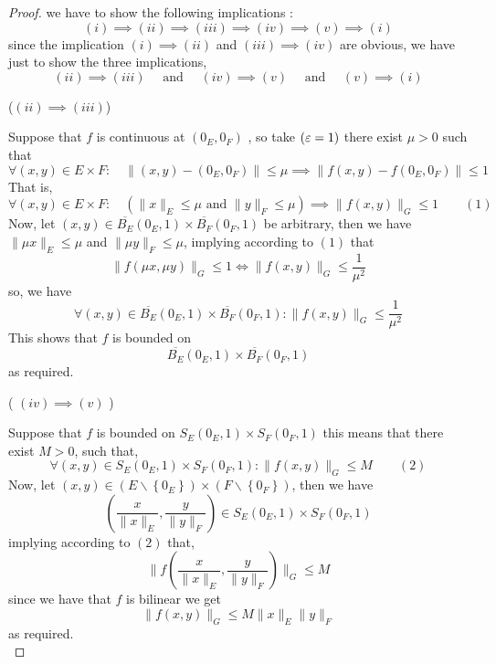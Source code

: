 \begin{proof}
we have to show the following implications : 
\[
(i)  \implies (ii) \implies (iii) \implies (iv) \implies (v) \implies  (i)      
\]
since the implication $(i ) \implies (ii)  $  and $(iii)  \implies (iv)  $ are obvious, 
we have just to show the three implications, 
\[
(ii) \implies (iii) \quad   \text{ and }   \quad 
(iv) \implies (v)  \quad   \text{ and } \quad    (v)  \implies (i)
\]

\begin{center}
	($(ii)  \implies (iii)  $) 
\end{center}

Suppose that $f $ is continuous at $(0_{E},0_{F})  $ , so take 
$( \varepsilon = 1)  $  there exist $\mu  > 0 $ such that 
\[
	\forall  (x,y)  \in E \times F  : \quad 
	\| (x,y) - (0_{E}, 0_{F})  \|  \leq  \mu \implies 
	\| f(x,y) - f(0_{E},0_{F})  \|  \leq 1
\]
That is,
\[
	\forall (x,y)  \in  E\times F  : \quad 
	\left( 
		\| x \| _{E} \leq \mu  \text{ and } 
		\| y \| _{F} \leq \mu  
	\right) \implies 
	\| f(x,y)  \|  _{G } \leq 1 \quad \quad  (1) 
\]
Now, let $(x,y)  \in  \overline{B_{E}} (0_{E},1) \times \overline{B_{F}}(0_{F},1)  $ 
be arbitrary, then we have $\| \mu x \| _{E} \leq \mu  $  and 
$\| \mu y \| _{F} \leq \mu $, implying according to $(1)  $   that 
\[
\| f(\mu x, \mu y)  \|  _{G} \leq  1 \iff 
\| f(x,y)  \| _{G} \leq \frac{1}{\mu ^2 }
\]
so, we have 
\[
\forall  (x,y) \in  \overline{B_{E}}(0_{E},1) \times \overline{B_{F}}(0_{F},1) : 
\| f(x,y)  \|  _{G} \leq \frac{1}{\mu ^2 }
\]
This shows that $f $ is bounded on  
\[
\overline{B_{E}}(0_{E},1)  \times \overline{B_{F}}(0_{F},1)  
\]
as required.
\begin{center}
	( $(iv) \implies  (v)  $ )
\end{center}
Suppose that $f $ is bounded on $S_{E}(0_{E},1) \times S_{F}(0_{F},1)  $ 
this means that there exist $M > 0 $, such that, 
\[
\forall (x,y) \in  S_{E}(0_{E},1)   \times 
S_{F}(0_{F},1) : \| f(x,y)  \|  _{G} \leq M \quad  \quad  (2) 
\]
Now, let $(x,y) \in  \left( E \backslash \left\{ 0_{E} \right\} \right)  
\times \left( F \backslash \left\{ 0_{F} \right\} \right) $, then 
we have 
\[
\left(
	\frac{x}{\| x \| _{E}} 
	, 
	\frac{y}{\| y \| _{F}}
\right) \in  S_{E}(0_{E},1)  \times 
S_{F}(0_{F},1) 
\]
implying according to $(2)$ that, 
\[
\| f \left( 
	\frac{x}{\| x \| _{E}} ,
	\frac{y}{\| y \| _{F}}
\right)  \| _{G} \leq M
\]
since we have that $f $ is bilinear we get 
\[
	\| f(x,y)  \|  _{G} \leq M \| x \| _{E} \| y \| _{F}
\]
as required. 
\\

\end{proof}
